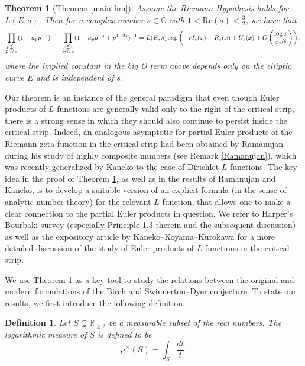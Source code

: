 \documentclass[12pt,reqno]{amsart}
\newtheorem{lettertheorem}{Theorem}
\newtheorem{definition}[theorem]{Definition}
\theoremstyle{definition}
\numberwithin{equation}{section}
\renewcommand{\Re}{\mathrm{Re}}
\begin{document}
\begin{lettertheorem}[Theorem \ref{mainthm}] \label{asymptotic}
Assume the Riemann Hypothesis holds for $L(E, s)$. Then for a complex number $s \in \mathbb C$ with $1< \Re(s)< \frac{3}{2}$,  we have that 
\begin{equation*}
\prod_ {\substack{p \leq x \\ p | N_E}}(1-a_pp^{-s})^{-1} \cdot  \prod_ {\substack{p \leq x \\ p \nmid N_E}} (1-a_pp^{-s}+p^{1-2s})^{-1}  = L(E, s)  \exp \left (-r I_s(x) - R_s(x) 
+  U_s(x)+ O \left ( \frac{\log x}{x^{1/6}} \right ) \right),  \\
\end{equation*}
where the implied constant in the big O term above depends only on the elliptic curve $E$ and is independent of $s$. 
\end{lettertheorem}



Our theorem is an instance of the general paradigm that even though Euler products of $L$-functions are generally valid only to the right of the critical strip,  there is a strong sense in which they should also continue to persist inside the critical strip. Indeed, 
an analogous asymptotic for partial Euler products of the Riemann zeta function in the critical strip had been obtained by Ramanujan \cite {Ramanujan1915} during his study of highly composite numbers (see Remark \ref{Ramanujan}), which was recently generalized by Kaneko \cite{Kaneko2022} to the case of  Dirichlet $L$-functions.  The key idea in the proof of Theorem \ref{asymptotic}, as well as in the results of Ramanujan and Kaneko, is to develop a suitable version of an explicit formula (in the sense of analytic number theory) for the relevant $L$-function, that allows one to make a clear connection to the partial Euler products in question. We refer to Harper's Bourbaki survey \cite{Harper2019} (especially Principle 1.3 therein and the subsequent discussion) as well as the expository article \cite{KanekoKoyamaKurokawa2022} by Kaneko--Koyama--Kurokawa  for a more detailed discussion of the study of Euler products of $L$-functions in the critical strip. 

We use Theorem \ref{asymptotic} as a key tool to study the relations between the original and modern formulations of the Birch and Swinnerton--Dyer conjecture.  To state our results, we first introduce the following definition. 

\begin{definition}
Let $S \subseteq \mathbb R_{\geq 2}$ be a measurable subset of the real numbers. The logarithmic measure of $S$ is defined to be 
$$
\mu^{\times}(S)= \int_{S} \frac{dt}{t}. 
$$
\end{definition}
\end{document}
